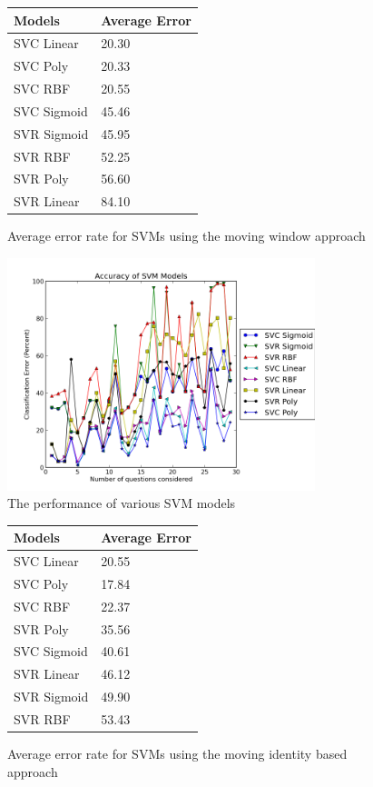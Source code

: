 \begin{figure}[h!]
\centering
\begin{tabular}{l || l }
Models & Average Error \\ \hline \hline
SVC Linear & 20.30 \\ \hline
SVC Poly & 20.33 \\ \hline
SVC RBF & 20.55 \\ \hline
SVC Sigmoid & 45.46 \\ \hline
SVR Sigmoid & 45.95 \\ \hline
SVR RBF & 52.25 \\ \hline
SVR Poly & 56.60 \\ \hline
SVR Linear & 84.10 \\ \hline

\end{tabular}
\caption{Average error rate for SVMs using the moving window approach}
\label{table:svmsmovingwindowaverages}
\end{figure}


\begin{figure}[h!]
\centering
\includegraphics[width=0.8\textwidth]{images/svmsidentified.png}
\caption{The performance of various SVM models}
\label{fig:svmsidentified}
\end{figure}

\begin{figure}[h!]
\centering
\begin{tabular}{l || l }
Models & Average Error \\ \hline \hline
SVC Linear & 20.55 \\ \hline
SVC Poly & 17.84 \\ \hline
SVC RBF & 22.37 \\ \hline
SVR Poly & 35.56 \\ \hline
SVC Sigmoid & 40.61 \\ \hline
SVR Linear & 46.12 \\ \hline
SVR Sigmoid & 49.90 \\ \hline
SVR RBF & 53.43 \\ \hline

\end{tabular}
\caption{Average error rate for SVMs using the moving identity based approach}
\label{table:svmsidentityaverages}
\end{figure}

